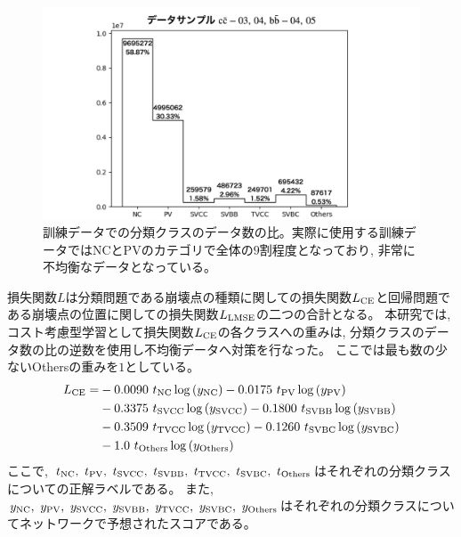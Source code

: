 \begin{figure}[htbp]
 \centering
 \includegraphics[width=1.0\textwidth]{Figure/3Networks/3-3-2-2ImbalancedData.png}
 \caption[訓練データでの分類クラスのデータ数の比]{訓練データでの分類クラスのデータ数の比。実際に使用する訓練データではNCとPVのカテゴリで全体の$9$割程度となっており, 非常に不均衡なデータとなっている。}
 \label{3-3-2-2ImbalancedData}
\end{figure}

損失関数$L$は分類問題である崩壊点の種類に関しての損失関数$L_{\rm CE}$と回帰問題である崩壊点の位置に関しての損失関数$L_{\rm LMSE}$の二つの合計となる。
\newpage
本研究では, コスト考慮型学習として損失関数$L_{\rm CE}$の各クラスへの重みは, 分類クラスのデータ数の比の逆数を使用し不均衡データへ対策を行なった。
ここでは最も数の少ないOthersの重みを$1$としている。
\begin{equation}
 \begin{split}
 L_{\rm CE} = & - 0.0090\  t_{\rm NC} \log{(y_{\rm NC})} - 0.0175\  t_{\rm PV} \log{(y_{\rm PV})} \\
       & - 0.3375\  t_{\rm SVCC} \log{(y_{\rm SVCC})} - 0.1800\  t_{\rm SVBB} \log{(y_{\rm SVBB})}\\
       & - 0.3509\  t_{\rm TVCC} \log{(y_{\rm TVCC})} - 0.1260\  t_{\rm SVBC} \log{(y_{\rm SVBC})}\\
       & - 1.0\  t_{\rm Others} \log{(y_{\rm Others})}\\
 \end{split}
\end{equation}
ここで, $t_{\rm NC},\ t_{\rm PV},\ t_{\rm SVCC},\ t_{\rm SVBB},\ t_{\rm TVCC},\ t_{\rm SVBC},\ t_{\rm Others}$はそれぞれの分類クラスについての正解ラベルである。
また, $y_{\rm NC},\ y_{\rm PV},\ y_{\rm SVCC},\ y_{\rm SVBB},\ y_{\rm TVCC},\ y_{\rm SVBC},\ y_{\rm Others}$はそれぞれの分類クラスについてネットワークで予想されたスコアである。

